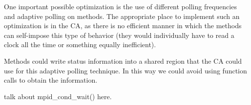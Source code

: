 \documentclass[11pt,letterpaper]{article}
\begin{document}
One important possible optimization is the use of different polling frequencies
and adaptive polling on methods.  The appropriate place to implement such an
optimization is in the CA, as there is no efficient manner in which the methods
can self-impose this type of behavior (they would individually have to read a
clock all the time or something equally inefficient).

Methods could write status information into a shared region that the CA could
use for this adaptive polling technique.  In this way we could avoid using
function calls to obtain the information.

%
%

talk about mpid\_cond\_wait() here.
\end{document}
